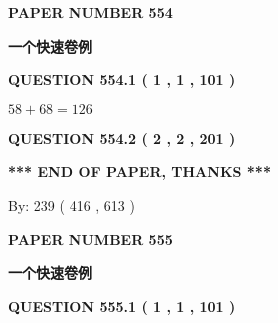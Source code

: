 \documentclass{ctexart}
\begin{document}
   
 {\textbf{ \Large{ PAPER NUMBER  554  }}}
   
   
\vspace{0.2in}
   
   
   
   
   
   
 \vspace{0.2in}
{\LARGE {\textbf{ 一个快速卷例}}}
   
   
  
\vspace{0.2in}
  
{\textbf{\Large{QUESTION
554.1 
 ( 1 , 1 , 101 )
}}}
  
  
 
 

$ %
58 +  %
68=   %
126$
 
 
  
\vspace{0.2in}
  
{\textbf{\Large{QUESTION
554.2 
 ( 2 , 2 , 201 )
}}}
  
  
   
   
 \vspace{0.2in}
 
   
   
   
   
\vspace{1.0in} 
{\textbf{\large{ *** END OF PAPER, THANKS *** }}} 
   
   
\hspace{1.0in} By: 
 239 ( 416 ,  613 )
   
   
   
   
\newpage 
\setcounter{page}{ 
   555001 } 
   
   
   
   
 {\textbf{ \Large{ PAPER NUMBER  555  }}}
   
   
\vspace{0.2in}
   
   
   
   
   
   
 \vspace{0.2in}
{\LARGE {\textbf{ 一个快速卷例}}}
   
   
  
\vspace{0.2in}
  
{\textbf{\Large{QUESTION
555.1 
 ( 1 , 1 , 101 )
}}}
  
\end{document}
